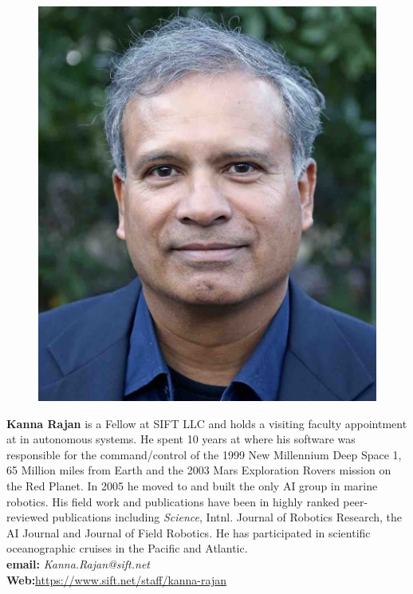 \documentclass[12pt]{article}
\begin{document}
\parbox{6.5in}{
\begin{figure}
  \centering
  \includegraphics[width=.75\linewidth]{fig/Krajan.jpg}
\end{figure}
\textbf{Kanna Rajan} is a Fellow at SIFT LLC and holds a visiting
faculty appointment at \univ in autonomous systems. He spent 10 years
at \inst where his software was responsible for the command/control of
the 1999 New Millennium Deep Space 1, 65 Million miles from Earth and
the 2003 Mars Exploration Rovers mission on the Red Planet. In 2005 he
moved to \mba and built the only AI group in marine robotics. His
field work and publications have been in highly ranked peer-reviewed
publications including \emph{Science}, Intnl. Journal of Robotics
Research, the AI Journal and Journal of Field Robotics. He has
participated in scientific oceanographic cruises in the Pacific and
Atlantic.
\\
\textbf{email: }\emph{Kanna.Rajan@sift.net}\\
\textbf{Web:}\url{https://www.sift.net/staff/kanna-rajan} }
\end{document}
